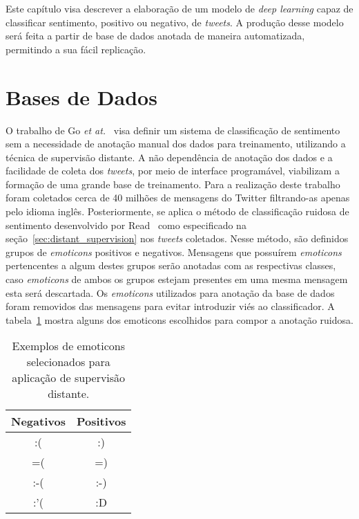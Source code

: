 Este capítulo visa descrever a elaboração de um modelo de \textit{deep learning} capaz de classificar sentimento,
positivo ou negativo, de \textit{tweets}.
A produção desse modelo será feita a partir de base de dados anotada de maneira automatizada, permitindo a sua
fácil replicação.

\section{Bases de Dados}

O trabalho de Go \textit{et at.}~\cite{go09} visa definir um sistema de classificação de sentimento sem a necessidade de
anotação manual dos dados para treinamento, utilizando a técnica de supervisão distante.
A não dependência de anotação dos dados e a facilidade de coleta dos \textit{tweets}, por meio de interface programável,
viabilizam a formação de uma grande base de treinamento.
Para a realização deste trabalho foram coletados cerca de 40 milhões de mensagens do Twitter filtrando-as apenas pelo
idioma inglês.
Posteriormente, se aplica o método de classificação ruidosa de sentimento desenvolvido por Read~\cite{read05} como
especificado na seção~\ref{sec:distant_supervision} nos \textit{tweets} coletados.
Nesse método, são definidos grupos de \textit{emoticons} positivos e negativos.
Mensagens que possuírem \textit{emoticons} pertencentes a algum destes grupos serão anotadas com as respectivas classes,
caso \textit{emoticons} de ambos os grupos estejam presentes em uma mesma mensagem esta será descartada.
Os \textit{emoticons} utilizados para anotação da base de dados foram removidos das mensagens para evitar introduzir
viés ao classificador.
A tabela~\ref{tab:emoticons} mostra alguns dos emoticons escolhidos para compor a anotação ruidosa.

\begin{table}[h]
    \begin{center}
        \begin{tabular}{| c | c |}
        \hline
        \textbf{Negativos} & \textbf{Positivos} \\ \hline
        :( & :) \\ \hline
        =( & =) \\ \hline
        :-( & :-) \\ \hline
        :'( & :D \\ \hline
        \end{tabular}
        \caption{Exemplos de emoticons selecionados para aplicação de supervisão distante.}
        \label{tab:emoticons}
    \end{center}
\end{table}

